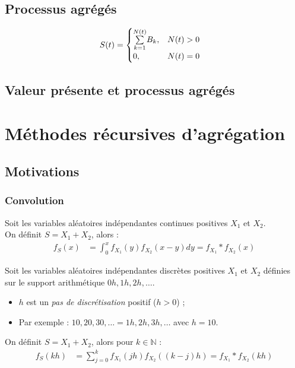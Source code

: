 \documentclass[10pt, french]{article}
\begin{document}
\begin{multicols*}{2}
\subsection{Processus agrégés}
\begin{align*}
	S(t)
	&=	\begin{cases}
		\overset{N(t)}{\underset{k = 1}{\sum}} B_{k},	&	N(t)	>	0	\\
		0,	&	N(t)	=	0
		\end{cases}
\end{align*}


\subsection{Valeur présente et processus agrégés}



\pagebreak
\section{Méthodes récursives d'agrégation}
\subsection{Motivations}
\subsubsection{Convolution}
\begin{rappel_enhanced}
Soit les variables aléatoires indépendantes continues positives $X_{1}$ et $X_{2}$.\\
On définit $S	=	X_{1} + X_{2}$, alors :
\begin{align*}
	f_{S}(x)
	&=	\int_{0}^{x} f_{X_{1}}(y) f_{X_{2}}(x - y) dy
	=	f_{X_{1}} \ast f_{X_{2}}(x)
\end{align*}

\tcbline

Soit les variables aléatoires indépendantes discrètes positives $X_{1}$ et $X_{2}$ définies sur le support arithmétique $0h, 1h, 2h, \dots$.
\begin{itemize}
	\item	$h$ est un \og \textit{pas de discrétisation} \fg{} positif ($h > 0$) ;
	\item	Par exemple : $10, 20, 30, \ldots  = 1h, 2h, 3h, \dots$ avec $h = 10$.
\end{itemize}

On définit $S	=	X_{1} + X_{2}$, alors pour $k \in \mathbb{N}$ :
\begin{align*}
	f_{S}(kh)
	&=	\sum_{j = 0}^{k} f_{X_{1}}(jh) f_{X_{2}}((k - j)h) 
	=	f_{X_{1}} \ast f_{X_{2}}(kh)
\end{align*}
\end{rappel_enhanced}


\end{multicols*}
\end{document}
